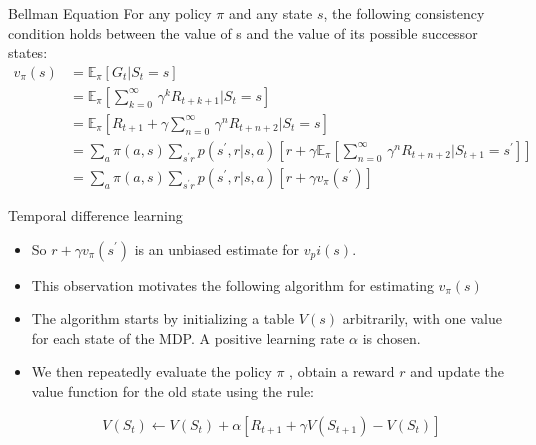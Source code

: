 \documentclass[11pt]{beamer}
\begin{document}
\begin{frame}{Bellman Equation}
For any policy $\pi$ and any state $s$, the following consistency
condition holds between the value of s and the value of its possible successor
states:
\begin{align*}v_\pi(s) &= \mathbb{E}_\pi \left[G_t \vert S_t=s \right] \\ &= \mathbb{E}_\pi \left[\sum\limits_{k=0}^\infty\, \gamma^k R_{t+k+1} \vert S_t=s \right] \\
&= \mathbb{E}_\pi \left[R_{t+1} + \gamma \sum\limits_{n=0}^\infty\, \gamma^n R_{t+n+2} \vert S_t=s \right] \\
&= \sum\limits_a \pi(a,s) \sum\limits_{s^\prime r} p(s^\prime, r \vert s, a)
\left[ r + \gamma \mathbb{E}_\pi \left[ \sum\limits_{n=0}^\infty\, \gamma^n R_{t+n+2} \vert S_{t+1}=s^\prime \right]\right]  \\
&= \sum\limits_a \pi(a,s) \sum\limits_{s^\prime r} p(s^\prime, r \vert s, a)
\left[ r + \gamma  v_\pi(s^\prime)\right]
\end{align*}

\end{frame}
\begin{frame}{Temporal difference learning}
	\begin{itemize}
		\item So $r +\gamma v_\pi(s^\prime)$ is an unbiased estimate for $v_pi(s)$. 
		\item This observation motivates the following algorithm for estimating $v_\pi(s)$

\item The algorithm starts by initializing a table $V(s)$ arbitrarily, with one value for each state of the MDP. A positive learning rate $\alpha$  is chosen.

\item We then repeatedly evaluate the policy $\pi$ , obtain a reward $r$ and update the value function for the old state using the rule:
\begin{tcolorbox}
\begin{equation} V(S_t) \leftarrow V(S_t) + \alpha \left[ R_{t+1} + \gamma V(S_{t+1}) - V(S_t) \right] \end{equation}
\end{tcolorbox}
	\end{itemize}
\end{frame}
\end{document}
